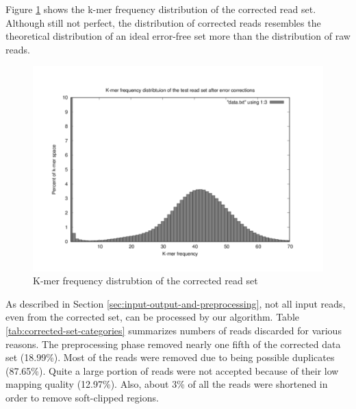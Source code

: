 Figure \ref{fig:test-kmer-frequency-distribution2} shows the k-mer frequency distribution of the corrected read set. Although still not perfect, the distribution of corrected reads resembles the theoretical distribution of an ideal error-free set more than the distribution of raw reads.

\begin{figure}[h]
\centering
\includegraphics{img/test-kmer-frequency-distribution2.pdf}
\caption{K-mer frequency distrubtion of the corrected read set}
\label{fig:test-kmer-frequency-distribution2}
\end{figure}

As described in Section \ref{sec:input-output-and-preprocessing}, not all input reads, even from the corrected set, can be processed by our algorithm. Table \ref{tab:corrected-set-categories} summarizes numbers of reads discarded for various reasons. The preprocessing phase removed nearly one fifth of the corrected data set (18.99\%). Most of the reads were removed due to being possible duplicates (87.65\%). Quite a large portion of  reads were not accepted because of their low mapping quality (12.97\%). Also, about 3\% of all the reads were shortened in order to remove soft-clipped regions.

